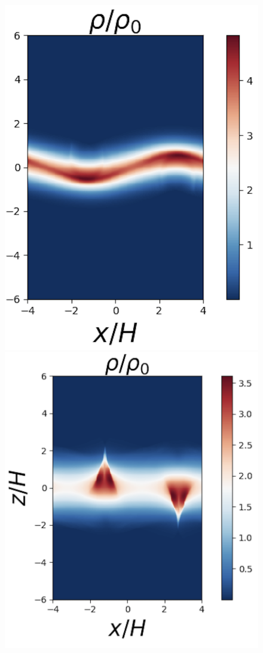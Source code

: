 \documentclass[fleqn,usenatbib]{mnras}
\begin{document}
\begin{figure}
\includegraphics[scale=0.39]{Figures/FlowField3.png}
\includegraphics[scale=0.26]{Figures/FlowField4.png}

\end{figure}
\end{document}
